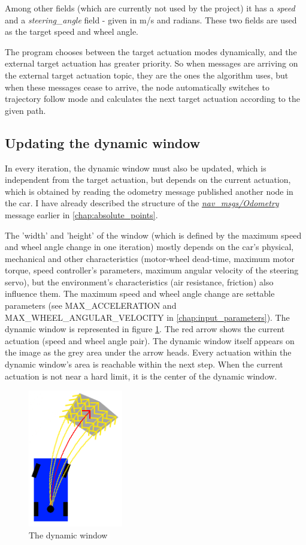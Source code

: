 Among other fields (which are currently not used by the project) it has a \textit{speed} and a \textit{steering\_angle} field - given in m/s and radians. These two fields are used as the target speed and wheel angle.

The program chooses between the target actuation modes dynamically, and the external target actuation has greater priority. So when messages are arriving on the external target actuation topic, they are the ones the algorithm uses, but when these messages cease to arrive, the node automatically switches to trajectory follow mode and calculates the next target actuation according to the given path.

\subsection{Updating the dynamic window}
In every iteration, the dynamic window must also be updated, which is independent from the target actuation, but depends on the current actuation, which is obtained by reading the odometry message published another node in the car. I have already described the structure of the \href{http://docs.ros.org/melodic/api/nav_msgs/html/msg/Odometry.html}{\textit{\textit{nav\_msgs/Odometry}}} message earlier in \ref{chap:absolute_points}.

The 'width' and 'height' of the window (which is defined by the maximum speed and wheel angle change in one iteration) mostly depends on the car's physical, mechanical and other characteristics (motor-wheel dead-time, maximum motor torque, speed controller's parameters, maximum angular velocity of the steering servo), but the environment's characteristics (air resistance, friction) also influence them. The maximum speed and wheel angle change are settable parameters (see MAX\_ACCELERATION and MAX\_WHEEL\_ANGULAR\_VELOCITY in \ref{chap:input_parameters}). The dynamic window is represented in figure \ref{dynamic_window}. The red arrow shows the current actuation (speed and wheel angle pair). The dynamic window itself appears on the image as the grey area under the arrow heads. Every actuation within the dynamic window's area is reachable within the next step. When the current actuation is not near a hard limit, it is the center of the dynamic window.

\begin{figure}[!ht]
    \centering
    \includegraphics[height=60mm]{figures/raw/dynamic_window.png}
    \caption{The dynamic window}
    \label{dynamic_window}
\end{figure}

